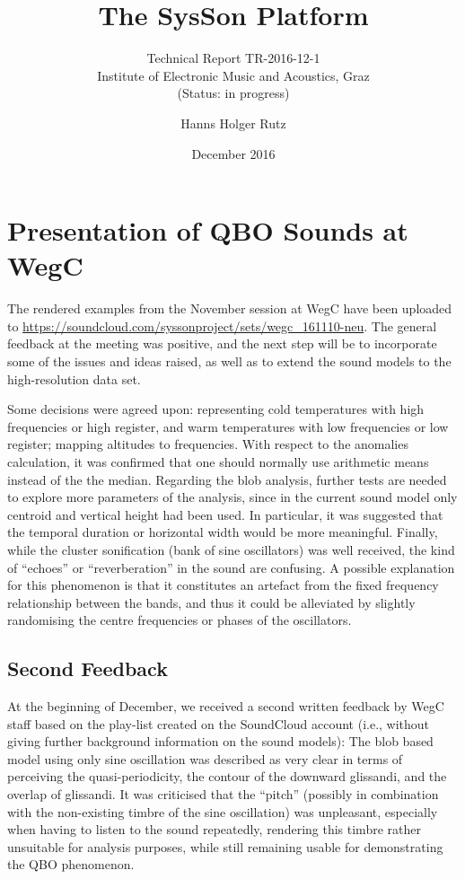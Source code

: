 \documentclass[11pt,a4paper]{article}
\title{The SysSon Platform}
\subtitle{Technical Report TR-2016-12-1\\Institute of Electronic Music and Acoustics, Graz\\(Status: in progress)}
\author{Hanns Holger Rutz}
\date{December 2016}
\begin{document}
\maketitle
{}
\thispagestyle{empty}
\newpage
\section{Presentation of QBO Sounds at WegC}

The rendered examples from the November session at WegC have been uploaded to \url{https://soundcloud.com/syssonproject/sets/wegc_161110-neu}. The general feedback at the meeting was positive, and the next step will be to incorporate some of the issues and ideas raised, as well as to extend the sound models to the high-resolution data set.

Some decisions were agreed upon: representing cold temperatures with high frequencies or high register, and warm temperatures with low frequencies or low register; mapping altitudes to frequencies. With respect to the anomalies calculation, it was confirmed that one should normally use arithmetic means instead of the the median. Regarding the blob analysis, further tests are needed to explore more parameters of the analysis, since in the current sound model only centroid and vertical height had been used. In particular, it was suggested that the temporal duration or horizontal width would be more meaningful. Finally, while the cluster sonification (bank of sine oscillators) was well received, the kind of ``echoes'' or ``reverberation'' in the sound are confusing. A possible explanation for this phenomenon is that it constitutes an artefact from the fixed frequency relationship between the bands, and thus it could be alleviated by slightly randomising the centre frequencies or phases of the oscillators.

\subsection*{Second Feedback}

At the beginning of December, we received a second written feedback by WegC staff based on the play-list created on the SoundCloud account (i.e., without giving further background information on the sound models): The blob based model using only sine oscillation was described as very clear in terms of perceiving the quasi-periodicity, the contour of the downward glissandi, and the overlap of glissandi. It was criticised that the ``pitch'' (possibly in combination with the non-existing timbre of the sine oscillation) was unpleasant, especially when having to listen to the sound repeatedly, rendering this timbre rather unsuitable for analysis purposes, while still remaining usable for demonstrating the QBO phenomenon.
\end{document}
